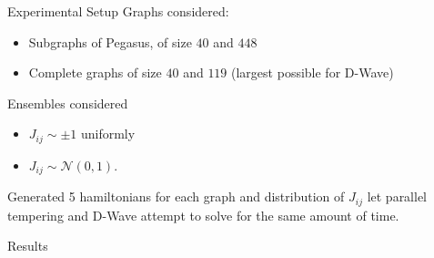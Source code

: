 \documentclass{beamer}
\begin{document}
\begin{frame}{Experimental Setup}
	Graphs considered:
	\begin{itemize}
		\item Subgraphs of Pegasus, of size $40$ and $448$ \\
		\item Complete graphs of size $40$ and $119$ (largest possible for D-Wave)
	\end{itemize}
Ensembles considered
\begin{itemize}
 \item $J_{ij} \sim \pm 1$ uniformly
 \item  $J_{ij} \sim \mathcal{N}(0, 1)$.
 \end{itemize} 
Generated 5 hamiltonians for each graph and distribution of $J_{i j}$ let parallel tempering and D-Wave attempt to solve for the same amount of time.
	\end{frame}

\begin{frame}{Results}
	\begin{figure}
		\centering
		 \\
		 \\
	\end{figure}

\end{frame}
\end{document}
